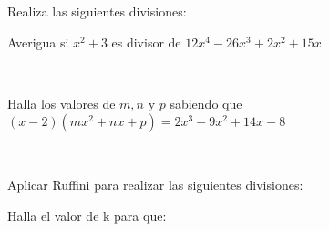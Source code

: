 \documentclass[spanish, 12pt]{exam}
\begin{document}
\begin{questions}


\question Realiza las siguientes divisiones:

\question Averigua si ${x^2} + 3$ es divisor de $12{x^4} - 26{x^3} + 2{x^2} + 15x$
\begin{solution} $ $ \end{solution}

\question Halla los valores de $m, n$ y $p$ sabiendo que $\left( {x - 2} \right)\left( {m{x^2} + nx + p} \right) = 2{x^3} - 9{x^2} + 14x - 8$
\begin{solution} $ $ \end{solution}


\question Aplicar Ruffini para realizar las siguientes divisiones:
\begin{multicols}{2}
\end{multicols}


\question Halla el valor de k para que:
\begin{multicols}{2}
\begin{parts}

\end{parts}
\end{multicols}
\end{questions}
\end{document}
